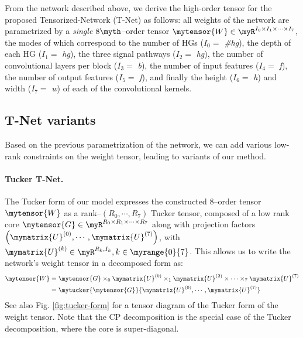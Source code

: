 \documentclass[10pt,twocolumn,letterpaper]{article}
\begin{document}
From the network described above, we derive the high-order tensor for the proposed Tensorized-Network (T-Net) as follows: all weights of the network are parametrized by a \emph{single} \(8\myth\)--order tensor \(\mytensor{W}  \in \myR^{I_0 \times I_1 \times \cdots \times I_7}\), the modes of which correspond to the number of HGs (\(I_0 = \) \emph{\#hg}), the depth of each HG (\(I_1 = \) \emph{hg}), the three signal pathways (\(I_2 = \) \emph{hg}), the number of convolutional layers per block (\(I_3 = \) \emph{b}), the number of input features (\(I_4 = \) \emph{f}), the number of output features (\(I_5 = \) \emph{f}), and finally the height (\(I_6 = \) \emph{h}) and width (\(I_7 = \) \emph{w}) of each of the convolutional kernels. 

\subsection{T-Net variants}
Based on the previous parametrization of the network, we can add various low-rank constraints on the weight tensor, leading to variants of our method.

\paragraph{Tucker T-Net.} The Tucker form of our model expresses the constructed 8\myth--order tensor \(\mytensor{W} \) as a rank--\((R_0, \cdots, R_7)\) Tucker tensor, composed of a low rank core 
\(\mytensor{G} \in \myR^{R_0 \times R_1 \times \cdots \times R_7}\) 
along with projection factors
\( \left( \mymatrix{U}^{(0)}, \cdots,\mymatrix{U}^{(7)} \right) \), with \(\mymatrix{U}^{(k)} \in \myR^{R_k, I_k}, k \in \myrange{0}{7}\).  This allows us to write the network's weight tensor in a decomposed form as:
\begin{align}
\mytensor{W} &=
\mytensor{G} \times_0 \mymatrix{U}^{(0)} 
		  \times_1  \mymatrix{U}^{(2)} \times
		  \cdots
          \times_7 \mymatrix{U}^{(7)}\\
          \nonumber 
          &= \mytucker{\mytensor{G}}{\mymatrix{U}^{(0)}, \cdots, \mymatrix{U}^{(7)}} 
\end{align}
See also Fig. \ref{fig:tucker-form} for a tensor diagram of the Tucker form of the weight tensor. Note that the CP decomposition is the special case of the Tucker decomposition, where the core is super-diagonal.
\end{document}
